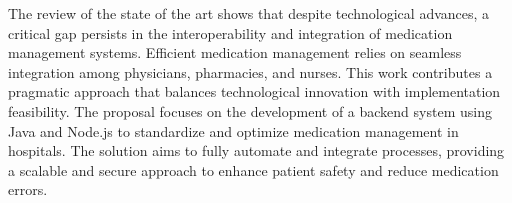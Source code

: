 The review of the state of the art shows that despite technological advances, a critical gap persists in the interoperability and integration of medication management systems. Efficient medication management relies on seamless integration among physicians, pharmacies, and nurses. This work contributes a pragmatic approach that balances technological innovation with implementation feasibility. The proposal focuses on the development of a backend system using Java and Node.js to standardize and optimize medication management in hospitals. The solution aims to fully automate and integrate processes, providing a scalable and secure approach to enhance patient safety and reduce medication errors. 